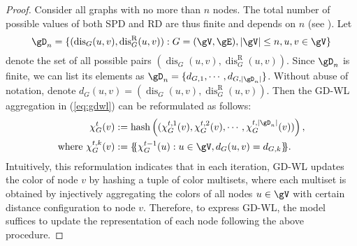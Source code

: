 \documentclass{article} %
\let\cref\crtcref
\newcommand*{\ldblbrace}{\{\mskip-5mu\{}
\newcommand*{\rdblbrace}{\}\mskip-5mu\}}
\newcommand*{\dis}{{\operatorname{dis}}}
\newcommand*{\disR}{\operatorname{dis}^\mathrm{R}}
\begin{document}
\begin{proof}
Consider all graphs with no more than $n$ nodes. The total number of possible values of both SPD and RD are thus finite and depends on $n$ (see \cref{sec:detail_of_rdwl}). Let
\begin{equation*}
    \gD_n=\{(\dis_G(u,v),\disR_G(u,v)):G=(\gV,\gE), |\gV|\le n,u,v\in\gV\}
\end{equation*}
denote the set of all possible pairs $(\dis_G(u,v),\disR_G(u,v))$. Since $\gD_n$ is finite, we can list its elements as $\gD_n=\{d_{G,1},\cdots,d_{G,|\gD_n|}\}$. Without abuse of notation, denote $d_G(u,v)=(\dis_G(u,v),\disR_G(u,v))$. Then the GD-WL aggregation in (\ref{eq:gdwl}) can be reformulated as follows:
\begin{equation}
    \label{eq:gdwl-equivalent}
    \begin{aligned}
    \chi_G^t(v)&:= \operatorname{hash}\left((
        \chi_G^{t,1}(v),
        \chi_G^{t,2}(v),
        \cdots,
        \chi_G^{t,|\gD_n|}(v)
    )\right), \\
    \text{where }\chi_G^{t,k}(v)&:=
    \ldblbrace \chi_G^{t-1}(u):u\in \gV, \textcolor{black}{d_G(u,v)=d_{G,k}} \rdblbrace.
    \end{aligned}
\end{equation}
Intuitively, this reformulation indicates that in each iteration, GD-WL updates the color of node $v$ by hashing a tuple of color multisets, where each multiset is obtained by injectively aggregating the colors of all nodes $u\in \gV$ with certain distance configuration to node $v$. Therefore, to express GD-WL, the model suffices to update the representation of each node following the above procedure.


\end{proof}
\end{document}
